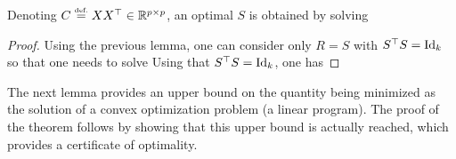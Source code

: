 \begin{lem}
	Denoting $C \stackrel{\mbox{\upshape\tiny def.}}{=} XX^\top \in \mathbb{R}^{p \times p}$, an optimal $S$ is obtained by solving
\end{lem}
\begin{proof}
	Using the previous lemma, one can consider only $R=S$ with $S^\top S=\mathrm{Id}_{k}$ so that one needs to solve
	Using that $S^\top S=\mathrm{Id}_k$, one has
\end{proof}

The next lemma provides an upper bound on the quantity being minimized as the solution of a convex optimization problem (a linear program). The proof of the theorem follows by showing that this upper bound is actually reached, which provides a certificate of optimality.  

